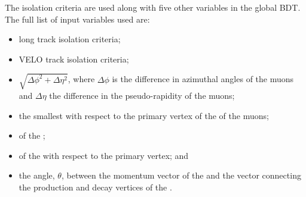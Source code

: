 

The isolation criteria are used along with five other variables in the global BDT. The full list of input variables used are:
\begin{itemize}
\item long track isolation criteria;
\item VELO track isolation criteria;
\item $\sqrt{\Delta \phi^{2} + \Delta \eta^{2}}$, where $\Delta \phi$ is the difference in azimuthal angles of the muons and $\Delta \eta$ the difference in the pseudo-rapidity of the muons;
\item the smallest \chiIP with respect to the primary vertex of the \bmumu of the muons;
\item \chivtx of the \bsd;
\item \chiIP of the \bsd with respect to the primary vertex; and
\item the angle, $\theta$, between the momentum vector of the \bsd and the vector connecting the production and decay vertices of the \bsd.
\end{itemize}

